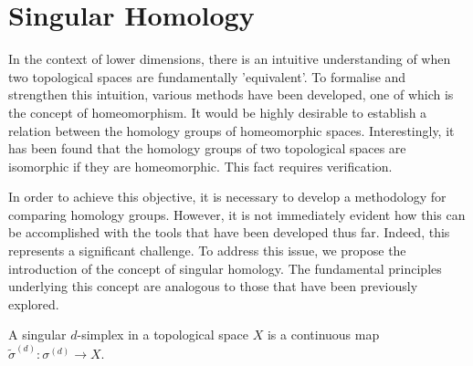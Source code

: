 \section{Singular Homology}
\label{SingularHomology}
In the context of lower dimensions, there is an intuitive understanding of when two topological spaces are fundamentally 'equivalent'. To formalise and strengthen this intuition, various methods have been developed, one of which is the concept of homeomorphism. It would be highly desirable to establish a relation between the homology groups of homeomorphic spaces. Interestingly, it has been found that the homology groups of two topological spaces are isomorphic if they are homeomorphic. This fact requires verification.

In order to achieve this objective, it is necessary to develop a methodology for comparing homology groups. However, it is not immediately evident how this can be accomplished with the tools that have been developed thus far. Indeed, this represents a significant challenge. To address this issue, we propose the introduction of the concept of singular homology. The fundamental principles underlying this concept are analogous to those that have been previously explored.

\begin{definition}
	A singular \( d \)-simplex in a topological space \( X \) is a continuous map \( \tilde{\sigma}^{(d)}: \sigma^{(d)} \to X \).
\end{definition}

